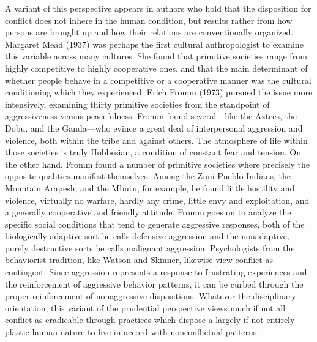 A variant of this perspective appears in authors who hold that the disposition for conflict does not inhere in the human condition, but results rather from how persons are brought up and how their relations are conventionally organized. Margaret Mead (1937) was perhaps the first cultural anthropologist to examine this variable across many cultures. She found that primitive societies range from highly competitive to highly cooperative ones, and that the main determinant of whether people behave in a competitive or a cooperative manner was the cultural conditioning which they experienced. Erich Fromm (1973) pursued the issue more intensively, examining thirty primitive societies from the standpoint of aggressiveness versus peacefulness. Fromm found several---like the Aztecs, the Dobu, and the Ganda---who evince a great deal of interpersonal aggression and violence, both within the tribe and against others. The atmosphere of life within those societies is truly Hobbesian, a condition of constant fear and tension. On the other hand, Fromm found a number of primitive societies where precisely the opposite qualities manifest themselves. Among the Zuni Pueblo Indians, the Mountain Arapesh, and the Mbutu, for example, he found little hostility and violence, virtually no warfare, hardly any crime, little envy and exploitation, and a generally cooperative and friendly attitude. Fromm goes on to analyze the specific social conditions that tend to generate aggressive responses, both of the biologically adaptive sort he calls defensive aggression and the nonadaptive, purely destructive sorts he calls malignant aggression. Psychologists from the behaviorist tradition, like Watson and Skinner, likewise view conflict as contingent. Since aggression represents a response to frustrating experiences and the reinforcement of aggressive behavior patterns, it can be curbed through the proper reinforcement of nonaggressive dispositions. Whatever the disciplinary orientation, this variant of the prudential perspective views much if not all conflict as eradicable through practices which dispose a largely if not entirely plastic human nature to live in accord with nonconflictual patterns. 

